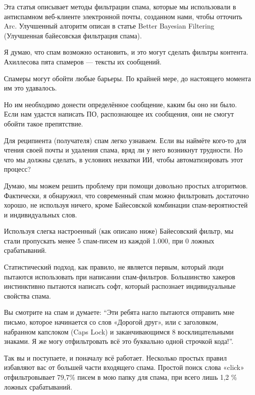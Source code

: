 \documentclass[ebook,12pt,oneside,openany]{memoir}
\begin{document}
\maketitle

Эта статья описывает методы фильтрации спама, которые мы использовали
в антиспамном веб-клиенте электронной почты, созданном нами, чтобы
отточить Arc. Улучшенный алгоритм описан в статье Better Bayesian
Filtering (Улучшенная байесовская фильтрация спама).

Я думаю, что спам возможно остановить, и это могут сделать фильтры
контента. Ахиллесова пята спамеров — тексты их сообщений.

Спамеры могут обойти любые барьеры. По крайней мере, до настоящего
момента им это удавалось.

Но им необходимо донести определённое сообщение, каким бы оно ни было.
Если нам удастся написать ПО, распознающее их сообщения, они не смогут
обойти такое препятствие.

Для реципиента (получателя) спам легко узнаваем. Если вы наймёте
кого-то для чтения своей почты и удаления спама, вряд ли у него
возникнут трудности. Но что мы должны сделать, в условиях нехватки ИИ,
чтобы автоматизировать этот процесс?

Думаю, мы можем решить проблему при помощи довольно простых
алгоритмов. Фактически, я обнаружил, что современный спам можно
фильтровать достаточно хорошо, не используя ничего, кроме Байесовской
комбинации спам-вероятностей и индивидуальных слов.

Используя слегка настроенный (как описано ниже) Байесовский фильтр, мы
стали пропускать менее 5 спам-писем из каждой 1.000, при 0 ложных
срабатываний.

Статистический подход, как правило, не является первым, который люди
пытаются использовать при написании спам-фильтров. Большинство хакеров
инстинктивно пытаются написать софт, который распознает индивидуальные
свойства спама.

Вы смотрите на спам и думаете: “Эти ребята нагло пытаются отправить
мне письмо, которое начинается со слов «Дорогой друг», или с
заголовком, набранном капслоком (Caps Lock) и заканчивающимся 8
восклицательными знаками. Я же могу отфильтровать всё это буквально
одной строчкой кода!”.

Так вы и поступаете, и поначалу всё работает. Несколько простых правил
избавляют вас от большей части входящего спама. Простой поиск слова
«click» отфильтровывает 79,7\% писем в мою папку для спама, при всего
лишь 1,2 \% ложных срабатываний.
\end{document}

